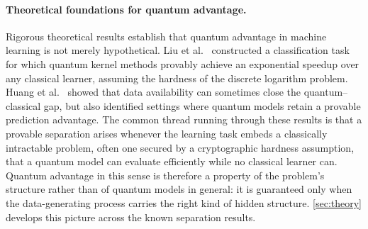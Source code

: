 \documentclass[aps,10pt,groupedaddress,prx,superscriptaddress,twocolumn,balancelastpage, tightenlines]{revtex4-2}
\theoremstyle{plain}  %
\begin{document}
\paragraph{Theoretical foundations for quantum advantage.}
Rigorous theoretical results establish that quantum advantage in machine learning is not merely hypothetical. Liu et al.~\cite{liu2021rigorous} constructed a classification task for which quantum kernel methods provably achieve an exponential speedup over any classical learner, assuming the hardness of the discrete logarithm problem. Huang et al.~\cite{huang2021power} showed that data availability can sometimes close the quantum--classical gap, but also identified settings where quantum models retain a provable prediction advantage. The common thread running through these results is that a provable separation arises whenever the learning task embeds a classically intractable problem, often one secured by a cryptographic hardness assumption, that a quantum model can evaluate efficiently while no classical learner can. Quantum advantage in this sense is therefore a property of the problem's structure rather than of quantum models in general: it is guaranteed only when the data-generating process carries the right kind of hidden structure. \autoref{sec:theory} develops this picture across the known separation results.
\end{document}
